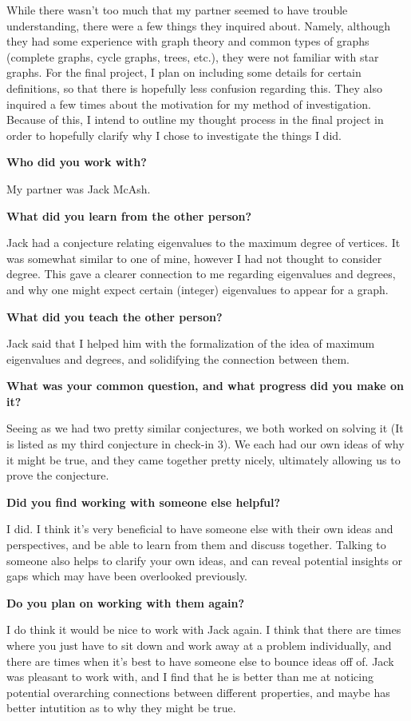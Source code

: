 \documentclass{article}
\begin{document}
While there wasn't too much that my partner seemed to have trouble understanding, there were a few things they inquired about.
Namely, although they had some experience with graph theory and common types of graphs (complete graphs, cycle graphs, trees, etc.), they were not familiar with star graphs.
For the final project, I plan on including some details for certain definitions, so that there is hopefully less confusion regarding this. \vsp
They also inquired a few times about the motivation for my method of investigation.
Because of this, I intend to outline my thought process in the final project in order to hopefully clarify why I chose to investigate the things I did.

\newpage
\textbf{Who did you work with?} \npgh

My partner was Jack McAsh. \npgh

\textbf{What did you learn from the other person?} \npgh

Jack had a conjecture relating eigenvalues to the maximum degree of vertices. It was somewhat similar to one of mine, however I had not thought to consider degree.
This gave a clearer connection to me regarding eigenvalues and degrees, and why one might expect certain (integer) eigenvalues to appear for a graph. \npgh

\textbf{What did you teach the other person?} \npgh

Jack said that I helped him with the formalization of the idea of maximum eigenvalues and degrees, and solidifying the connection between them. \npgh

\textbf{What was your common question, and what progress did you make on it?} \npgh

Seeing as we had two pretty similar conjectures, we both worked on solving it (It is listed as my third conjecture in check-in 3).
We each had our own ideas of why it might be true, and they came together pretty nicely, ultimately allowing us to prove the conjecture. \npgh

\textbf{Did you find working with someone else helpful?} \npgh

I did. I think it's very beneficial to have someone else with their own ideas and perspectives, and be able to learn from them and discuss together.
Talking to someone also helps to clarify your own ideas, and can reveal potential insights or gaps which may have been overlooked previously. \npgh

\textbf{Do you plan on working with them again?} \npgh

I do think it would be nice to work with Jack again. I think that there are times where you just have to sit down and work away at a problem individually,
and there are times when it's best to have someone else to bounce ideas off of. Jack was pleasant to work with, and I find that he is better than me at
noticing potential overarching connections between different properties, and maybe has better intutition as to why they might be true.
\end{document}
